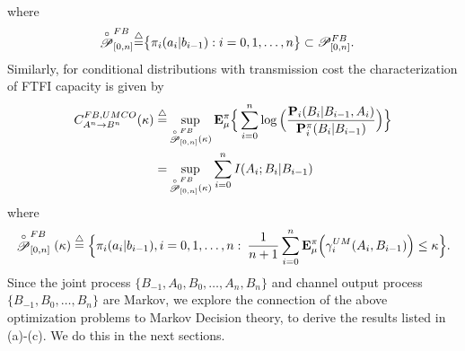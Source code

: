 \documentclass[11pt, a4paper, journal,onecolumn]{IEEEtran}
\newcommand{\sr}{\stackrel}
\newcommand{\rar}{\rightarrow}
\newcommand{\tri}{\sr{\triangle}{=}}
\newcommand{\bea}{\begin{eqnarray}}
\newcommand{\eea}{\end{eqnarray}}
\begin{document}
 where
 \begin{align}
 \sr{\circ}{ {\cal P}}_{[0,n]}^{FB} \tri&     \big\{ \pi_i(a_i|b_{i-1}):i=0, 1, \ldots, n\big\} \subset  {\cal P}_{[0,n]}^{FB}. 
\end{align}
Similarly, for conditional distributions with transmission cost the characterization of FTFI capacity  is given by 
\begin{align}
C_{A^n \rar B^n}^{FB,UMCO}(\kappa) \tri &\sup_{ \sr{\circ}{ {\cal P}}_{[0,n]}^{FB}(\kappa)   } {\bf E}^\pi_{\mu} \Big\{    \sum_{i=0}^n  \log \Big(   \frac{ {\bf P}_i(B_i|B_{i-1}, A_i)}{ {\bf P}_i^\pi(B_i|B_{i-1})}\Big) \Big\} \\
 =&\sup_{\sr{\circ}{ {\cal P}}_{[0,n]}^{FB}(\kappa)  } \sum_{i=0}^n I(A_i; B_i|B_{i-1}) \label{CID_A.2.2}
\end{align}
where
\bea
\sr{\circ}{ {\cal P}}_{[0,n]}^{FB}(\kappa) \tri     \Big\{ {\pi}_i(a_i|b_{i-1}), i=0, 1, \ldots, n:  \: \frac{1}{n+1} \sum_{i=0}^n  {\bf E}^\pi_{\mu}\Big( \gamma_i^{UM}(A_i, B_{i-1})\Big) \leq \kappa \Big\}.  \label{CID_A.2}
\eea
Since the joint process $\{B_{-1}, A_0, B_0, \ldots, A_n, B_n \}$ and channel output process $\{B_{-1}, B_0, \ldots, B_n\}$ are Markov, we   explore the connection of the above optimization problems to Markov Decision theory,  to derive  the results listed in (a)-(c). 
We do this in the next sections. 
%
%
\end{document}
